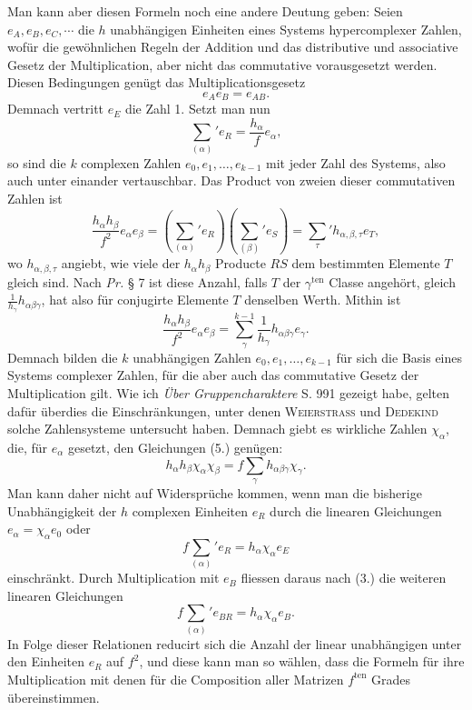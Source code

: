 \documentclass[11pt]{article}
\newcommand{\ten}{\mathrm{ten}}
\begin{document}
Man kann aber diesen Formeln noch eine andere Deutung geben: Seien $e_A,e_B,e_C,\cdots$ die $h$ unabhängigen Einheiten eines Systems hypercomplexer Zahlen, wofür die gewöhnlichen Regeln der Addition und das distributive und associative Gesetz der Multiplication, aber nicht das commutative vorausgesetzt werden. Diesen Bedingungen genügt das Multiplicationsgesetz
\begin{equation}\tag{3.}
e_Ae_B=e_{AB}.
\end{equation}
Demnach vertritt $e_E$ die Zahl 1. Setzt man nun
\begin{equation}\tag{4.}
\sum_{(\alpha)}'e_R=\frac{h_\alpha}{f}e_\alpha,
\end{equation}
so sind die $k$ complexen Zahlen $e_0,e_1,\ldots,e_{k-1}$ mit jeder Zahl des Systems, also auch unter einander vertauschbar. Das Product von zweien dieser commutativen Zahlen ist
\[
\frac{h_\alpha h_\beta}{f^2}e_\alpha e_\beta
=\left(\sum_{(\alpha)}'e_R\right)\left(\sum_{(\beta)}'e_S\right)
=\sum_\tau' h_{\alpha,\beta,\tau} e_T,
\]
wo $h_{\alpha,\beta,\tau}$ angiebt, wie viele der $h_\alpha h_\beta$ Producte $RS$ dem bestimmten Elemente $T$ gleich sind. Nach \emph{Pr.} § 7 ist diese Anzahl, falls $T$ der $\gamma^{\ten}$ Classe angehört, gleich $\frac{1}{h_\gamma}h_{\alpha\beta\gamma}$, hat also für conjugirte Elemente $T$ denselben Werth. Mithin ist
\begin{equation}\tag{5.}
\frac{h_\alpha h_\beta}{f^2}e_\alpha e_\beta
=\sum_\gamma^{k-1}\frac{1}{h_\gamma}h_{\alpha\beta\gamma}e_\gamma.
\end{equation}
Demnach bilden die $k$ unabhängigen Zahlen $e_0,e_1,\ldots,e_{k-1}$ für sich die Basis eines Systems complexer Zahlen, für die aber auch das commutative Gesetz der Multiplication gilt. Wie ich \emph{Über Gruppencharaktere} S. 991 gezeigt habe, gelten dafür überdies die Einschränkungen, unter denen \textsc{Weierstrass} und \textsc{Dedekind} solche Zahlensysteme untersucht haben. Demnach giebt es wirkliche Zahlen $\chi_\alpha$, die, für $e_\alpha$ gesetzt, den Gleichungen (5.) genügen:
\begin{equation}\tag{6.}
h_\alpha h_\beta\chi_\alpha\chi_\beta=f\sum_\gamma h_{\alpha\beta\gamma}\chi_\gamma.
\end{equation}
Man kann daher nicht auf Widersprüche kommen, wenn man die bisherige Unabhängigkeit der $h$ complexen Einheiten $e_R$ durch die linearen Gleichungen $e_\alpha=\chi_\alpha e_0$ oder
\begin{equation}\tag{7.}
f\sum_{(\alpha)}'e_R=h_\alpha\chi_\alpha e_E
\end{equation}
einschränkt. Durch Multiplication mit $e_B$ fliessen daraus nach (3.) die weiteren linearen Gleichungen
\begin{equation}\tag{8.}
f\sum_{(\alpha)}'e_{BR}=h_\alpha\chi_\alpha e_B.
\end{equation}
In Folge dieser Relationen reducirt sich die Anzahl der linear unabhängigen unter den Einheiten $e_R$ auf $f^2$, und diese kann man so wählen, dass die Formeln für ihre Multiplication mit denen für die Composition aller Matrizen $f^{\ten}$ Grades übereinstimmen.
\end{document}
